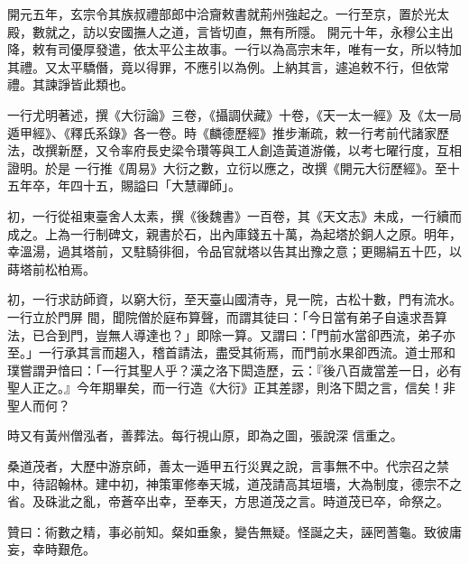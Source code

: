 \begin{pinyinscope}
 開元五年，玄宗令其族叔禮部郎中洽齎敕書就荊州強起之。一行至京，置於光太殿，數就之，訪以安國撫人之道，言皆切直，無有所隱。
 開元十年，永穆公主出降，敕有司優厚發遣，依太平公主故事。一行以為高宗末年，唯有一女，所以特加其禮。又太平驕僭，竟以得罪，不應引以為例。上納其言，遽追敕不行，但依常禮。其諫諍皆此類也。



 一行尤明著述，撰《大衍論》三卷，《攝調伏藏》十卷，《天一太一經》及《太一局遁甲經》、《釋氏系錄》各一卷。時《麟德歷經》推步漸疏，敕一行考前代諸家歷法，改撰新歷，又令率府長史梁令瓚等與工人創造黃道游儀，以考七曜行度，互相證明。於是
 一行推《周易》大衍之數，立衍以應之，改撰《開元大衍歷經》。至十五年卒，年四十五，賜謚曰「大慧禪師」。



 初，一行從祖東臺舍人太素，撰《後魏書》一百卷，其《天文志》未成，一行續而成之。上為一行制碑文，親書於石，出內庫錢五十萬，為起塔於銅人之原。明年，幸溫湯，過其塔前，又駐騎徘徊，令品官就塔以告其出豫之意；更賜絹五十匹，以蒔塔前松柏焉。



 初，一行求訪師資，以窮大衍，至天臺山國清寺，見一院，古松十數，門有流水。一行立於門屏
 間，聞院僧於庭布算聲，而謂其徒曰：「今日當有弟子自遠求吾算法，已合到門，豈無人導達也？」即除一算。又謂曰：「門前水當卻西流，弟子亦至。」一行承其言而趨入，稽首請法，盡受其術焉，而門前水果卻西流。道士邢和璞嘗謂尹愔曰：「一行其聖人乎？漢之洛下閎造歷，云：『後八百歲當差一日，必有聖人正之。』今年期畢矣，而一行造《大衍》正其差謬，則洛下閎之言，信矣！非聖人而何？



 時又有黃州僧泓者，善葬法。每行視山原，即為之圖，張說深
 信重之。



 桑道茂者，大歷中游京師，善太一遁甲五行災異之說，言事無不中。代宗召之禁中，待詔翰林。建中初，神策軍修奉天城，道茂請高其垣墻，大為制度，德宗不之省。及硃泚之亂，帝蒼卒出幸，至奉天，方思道茂之言。時道茂已卒，命祭之。



 贊曰：術數之精，事必前知。粲如垂象，變告無疑。怪誕之夫，誣罔蓍龜。致彼庸妄，幸時艱危。



\end{pinyinscope}